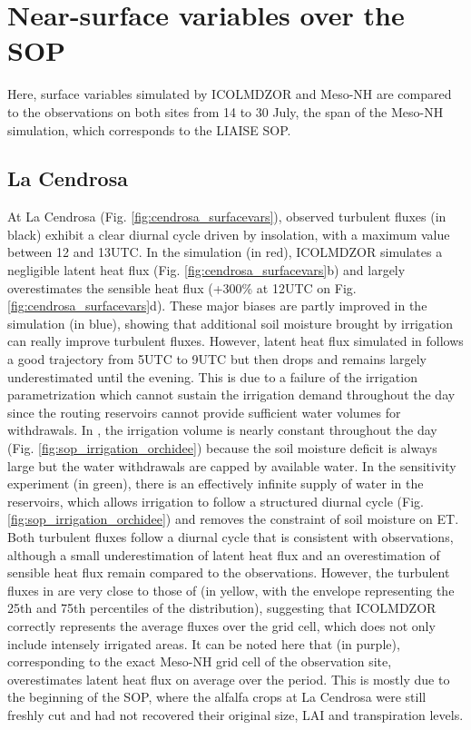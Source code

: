 \section{Near-surface variables over the SOP}
\label{sec:sop}

Here, surface variables simulated by ICOLMDZOR and Meso-NH are compared to the observations on both sites from 14 to 30 July, the span of the Meso-NH simulation, which corresponds to the LIAISE SOP.

\subsection*{La Cendrosa}
At La Cendrosa (Fig. \ref{fig:cendrosa_surfacevars}), observed turbulent fluxes (in black) exhibit a clear diurnal cycle driven by insolation, with a maximum value between 12 and 13UTC.
In the \noirr simulation (in red), ICOLMDZOR simulates a negligible latent heat flux (Fig. \ref{fig:cendrosa_surfacevars}b) and largely overestimates the sensible heat flux (+300\% at 12UTC on Fig. \ref{fig:cendrosa_surfacevars}d). 
These major biases are partly improved in the \irr simulation (in blue), showing that additional soil moisture brought by irrigation can really improve turbulent fluxes. However, latent heat flux simulated in \irr follows a good trajectory from 5UTC to 9UTC but then drops and remains largely underestimated until the evening. This is due to a failure of the irrigation parametrization which cannot sustain the irrigation demand throughout the day since the routing reservoirs cannot provide sufficient water volumes for withdrawals. In \irr, the irrigation volume is nearly constant throughout the day (Fig. \ref{fig:sop_irrigation_orchidee}) because the soil moisture deficit is always large but the water withdrawals are capped by available water.
In the \irrboost sensitivity experiment (in green), there is an effectively infinite supply of water in the reservoirs, which allows irrigation to follow a structured diurnal cycle (Fig. \ref{fig:sop_irrigation_orchidee}) and removes the constraint of soil moisture on ET. Both turbulent fluxes follow a diurnal cycle that is consistent with observations, although a small underestimation of latent heat flux and an overestimation of sensible heat flux remain compared to the observations. 
However, the turbulent fluxes in \irrboost are very close to those of \mesomean (in yellow, with the envelope representing the 25th and 75th percentiles of the distribution), suggesting that ICOLMDZOR correctly represents the average fluxes over the grid cell, which does not only include intensely irrigated areas.
It can be noted here that \mesoexact (in purple), corresponding to the exact Meso-NH grid cell of the observation site, overestimates latent heat flux on average over the period. This is mostly due to the beginning of the SOP, where the alfalfa crops at La Cendrosa were still freshly cut and had not recovered their original size, LAI and transpiration levels.

